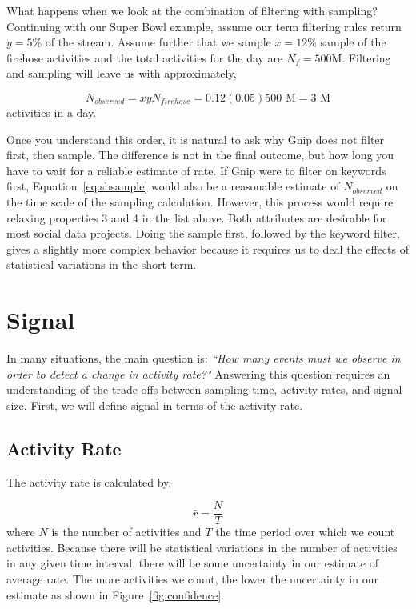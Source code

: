 \documentclass{article}
\begin{document}
What happens when we look at the combination of filtering with sampling?  Continuing with our Super Bowl example, 
assume our term filtering rules return $y=5\%$ of the stream. Assume further that we sample $x=12\%$ sample of 
the firehose activities and the total activities for the day are $N_f=500$M. Filtering and sampling will leave us with 
approximately,

\begin{equation}
    \label{eq:sbsample}
    N_{observed} = x y N_{firehose}= 0.12 (0.05) 500 \textrm{ M} = 3 \textrm{ M}
\end{equation}
activities in a day. 

Once you understand this order, it is natural to ask why Gnip does not filter first, then sample. The difference is not
in the final outcome, but how long you have to wait for a reliable estimate of rate. If Gnip were to filter on keywords
first, Equation~\ref{eq:sbsample} would also be a reasonable estimate of $N_{observed}$ on the time scale of the 
sampling calculation. However, this process would require relaxing properties 3 and 4 in the list above. Both attributes
are desirable for most social data projects. Doing the sample first, followed by the keyword filter, gives a slightly
more complex behavior because it requires us to deal the effects of statistical variations in the short term.

\section{Signal} 

In many situations, the main question is: \emph{``How many events must we observe in order to detect a change in activity rate?"} Answering
this question requires an understanding of the trade offs between sampling time, activity rates, and signal size.  First, 
we will define signal in terms of the activity rate.

\subsection{Activity Rate} 

The activity rate is calculated by,

\begin{equation}
    \label{eq:rateEst}
    \bar{r} = \frac{N}{T}
\end{equation}
where $N$ is the number of activities and $T$ the time period over which we count activities.  Because there will be statistical
variations in the number of activities in any given time interval, there will be some uncertainty in our estimate of average rate. 
The more activities we count, the lower the uncertainty in our estimate as shown in Figure~\ref{fig:confidence}.
\end{document}
